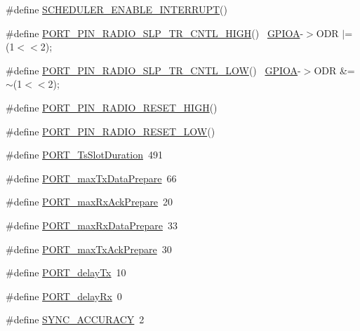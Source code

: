 \begin{DoxyCompactItemize}
\item 
\#define \hyperlink{iot-lab___a8-_m3_2board__info_8h_a629721de419fa273ad4a7d63e38060a1}{S\+C\+H\+E\+D\+U\+L\+E\+R\+\_\+\+E\+N\+A\+B\+L\+E\+\_\+\+I\+N\+T\+E\+R\+R\+U\+PT}()            
\item 
\#define \hyperlink{iot-lab___a8-_m3_2board__info_8h_a0c94ab822e20845b464e5e57d9e921ac}{P\+O\+R\+T\+\_\+\+P\+I\+N\+\_\+\+R\+A\+D\+I\+O\+\_\+\+S\+L\+P\+\_\+\+T\+R\+\_\+\+C\+N\+T\+L\+\_\+\+H\+I\+GH}()      ~\hyperlink{group___peripheral__declaration_gac485358099728ddae050db37924dd6b7}{G\+P\+I\+OA}-\/$>$O\+DR $\vert$= (1$<$$<$2);
\item 
\#define \hyperlink{iot-lab___a8-_m3_2board__info_8h_ac5ffe05e057c8ef9e409c9f694d6c0ed}{P\+O\+R\+T\+\_\+\+P\+I\+N\+\_\+\+R\+A\+D\+I\+O\+\_\+\+S\+L\+P\+\_\+\+T\+R\+\_\+\+C\+N\+T\+L\+\_\+\+L\+OW}()        ~\hyperlink{group___peripheral__declaration_gac485358099728ddae050db37924dd6b7}{G\+P\+I\+OA}-\/$>$O\+DR \&= $\sim$(1$<$$<$2);
\item 
\#define \hyperlink{iot-lab___a8-_m3_2board__info_8h_af4a130f509ad3aa6287a1a21d393a91e}{P\+O\+R\+T\+\_\+\+P\+I\+N\+\_\+\+R\+A\+D\+I\+O\+\_\+\+R\+E\+S\+E\+T\+\_\+\+H\+I\+GH}()          
\item 
\#define \hyperlink{iot-lab___a8-_m3_2board__info_8h_a3946c37e363c4de9a256eb6c772e95bb}{P\+O\+R\+T\+\_\+\+P\+I\+N\+\_\+\+R\+A\+D\+I\+O\+\_\+\+R\+E\+S\+E\+T\+\_\+\+L\+OW}()            
\item 
\#define \hyperlink{iot-lab___a8-_m3_2board__info_8h_a753468943519d7d3ed61ea7134df2f11}{P\+O\+R\+T\+\_\+\+Ts\+Slot\+Duration}~491
\item 
\#define \hyperlink{iot-lab___a8-_m3_2board__info_8h_af45f329a1d2c1097af1d022b6363b0ed}{P\+O\+R\+T\+\_\+max\+Tx\+Data\+Prepare}~66
\item 
\#define \hyperlink{iot-lab___a8-_m3_2board__info_8h_a238f21ff0cb8bed569124960f22f882e}{P\+O\+R\+T\+\_\+max\+Rx\+Ack\+Prepare}~20
\item 
\#define \hyperlink{iot-lab___a8-_m3_2board__info_8h_a9e21d179374e68398446ff4353ad8318}{P\+O\+R\+T\+\_\+max\+Rx\+Data\+Prepare}~33
\item 
\#define \hyperlink{iot-lab___a8-_m3_2board__info_8h_a8c4fcdb6e44dcf5103f7f727b2cf42b8}{P\+O\+R\+T\+\_\+max\+Tx\+Ack\+Prepare}~30
\item 
\#define \hyperlink{iot-lab___a8-_m3_2board__info_8h_ad5778702c9656470618b2d8c1c82423a}{P\+O\+R\+T\+\_\+delay\+Tx}~10
\item 
\#define \hyperlink{iot-lab___a8-_m3_2board__info_8h_a26ca518d2e84908d5486fe5d5d384f52}{P\+O\+R\+T\+\_\+delay\+Rx}~0
\item 
\#define \hyperlink{iot-lab___a8-_m3_2board__info_8h_a190d1e774c272ae302ed98c400694f9a}{S\+Y\+N\+C\+\_\+\+A\+C\+C\+U\+R\+A\+CY}~2
\end{DoxyCompactItemize}


